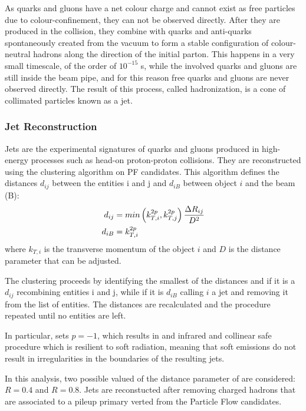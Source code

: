 As quarks and gluons have a net colour charge and cannot exist as free particles due to colour-confinement, they can not be observed directly.
After they are produced in the collision, they combine with quarks and anti-quarks spontaneously created from the vacuum
to form a stable configuration of colour-neutral hadrons along the direction of the initial parton.
This happens in a very small timescale, of the order of $10^{-15}$ s, while the involved quarks and gluons are still inside the beam pipe,
and for this reason free quarks and gluons are never observed directly.
The result of this process, called hadronization, is a cone of collimated particles known as a jet.

\subsubsection{Jet Reconstruction}

Jets are the experimental signatures of quarks and gluons produced in high-energy processes such as head-on proton-proton collisions.
They are reconstructed using the \antikt clustering algorithm \cite{Cacciari:2008gp} on PF candidates.
This algorithm defines the distances $d_{ij}$ between the entities i and j and $d_{iB}$ between object $i$ and the beam (B):
\begin{equation}
\begin{split}
d_{ij} &= min \left( k^{2p}_{T,i}, k^{2p}_{T,j} \right) \frac{\Delta R_{ij}}{D^2}\\
d_{iB} &= k^{2p}_{T,i}
\end{split}
\end{equation}
where $k_{T, i}$ is the transverse momentum of the object $i$ and $D$ is the distance parameter that can be adjusted.

The clustering proceeds by identifying the smallest of the distances and if it is a $d_{ij}$ recombining entities i and j,
while if it is $d_{iB}$ calling $i$ a jet and removing it from the list of entities.
The distances are recalculated and the procedure repeated until no entities are left.

In particular, \antikt sets $p = -1$, which results in and infrared and collinear safe procedure which is resilient to soft radiation,
meaning that soft emissions do not result in irregularities in the boundaries of the resulting jets.

In this analysis, two possible valued of the distance parameter of \antikt are considered: $R = 0.4$ and $R = 0.8$.
Jets are reconstucted after removing charged hadrons that are associated to a pileup primary verted from the Particle Flow candidates.

